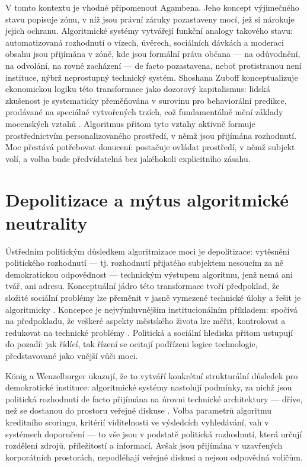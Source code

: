 V tomto kontextu je vhodné připomenout Agambena.
Jeho koncept výjimečného stavu \parencite{Agamben05} popisuje zónu, v níž jsou právní záruky pozastaveny mocí, jež si nárokuje jejich ochranu.
Algoritmické systémy vytvářejí funkční analogy takového stavu: automatizovaná rozhodnutí o vízech, úvěrech, sociálních dávkách a moderaci obsahu jsou přijímána v zóně, kde jsou formální práva občana — na odůvodnění, na odvolání, na rovné zacházení — de facto pozastavena, neboť protistranou není instituce, nýbrž neprostupný technický systém. Shoshana Zuboff konceptualizuje ekonomickou logiku této transformace jako dozorový kapitalismus: lidská zkušenost je systematicky přeměňována v surovinu pro behaviorální predikce, prodávané na speciálně vytvořených trzích, což fundamentálně mění základy mocenských vztahů \parencite{Zuboff19}.
Algoritmus přitom tyto vztahy aktivně formuje prostřednictvím personalizovaného prostředí, v němž jsou přijímána rozhodnutí.
Moc přestává potřebovat donucení: postačuje ovládat prostředí, v němž subjekt volí, a volba bude předvídatelná bez jakéhokoli explicitního zásahu.

\section{Depolitizace a mýtus algoritmické neutrality}

Ústředním politickým důsledkem algoritmizace moci je depolitizace: vytěsnění politického rozhodnutí — tj. rozhodnutí přijatého subjektem nesoucím za ně demokratickou odpovědnost — technickým výstupem algoritmu, jenž nemá ani tvář, ani adresu. Konceptuální jádro této transformace tvoří předpoklad, že složité sociální problémy lze přeměnit v jasně vymezené technické úlohy a řešit je algoritmicky \parencite{JanssenKuk16}. Koncepce  je nejvýmluvnějším institucionálním příkladem: spočívá na předpokladu, že veškeré aspekty městského života lze měřit, kontrolovat a redukovat na technické problémy \parencite{Kitchin14}. Politická a sociální hlediska přitom ustupují do pozadí: jak řídící, tak řízení se ocitají podřízeni logice technologie, představované jako vnější vůči moci.

König a Wenzelburger ukazují, že to vytváří konkrétní strukturální důsledek pro demokratické instituce: algoritmické systémy nastolují podmínky, za nichž jsou politická rozhodnutí de facto přijímána na úrovni technické architektury — dříve, než se dostanou do prostoru veřejné diskuse \parencite{KoenigWenzelburger20}. Volba parametrů algoritmu kreditního scoringu, kritérií viditelnosti ve výsledcích vyhledávání, vah v systémech doporučení — to vše jsou v podstatě politická rozhodnutí, která určují rozdělení zdrojů, příležitostí a informací. Avšak jsou přijímána v uzavřených korporátních prostorách, nepodléhají veřejné diskusi a nejsou odpovědná voličům.

